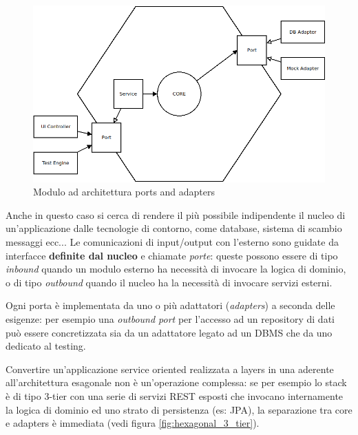 \begin{figure}[h]
	\centering
	\includegraphics[scale=0.5]{img/hexagonal}
	\caption{Modulo ad architettura ports and adapters}
	\label{fig:hexagonal}
\end{figure}

Anche in questo caso si cerca di rendere il più possibile indipendente il nucleo di un'applicazione dalle tecnologie di contorno, come database, sistema di scambio messaggi ecc...
Le comunicazioni di input/output con l'esterno sono guidate da interfacce \textbf{definite dal nucleo} e chiamate \textit{porte}: queste possono essere di tipo \textit{inbound} quando un modulo esterno ha necessità di invocare la logica di dominio, o di tipo \textit{outbound} quando il nucleo ha la necessità di invocare servizi esterni.

Ogni porta è implementata da uno o più adattatori (\textit{adapters}) a seconda delle esigenze: per esempio una \textit{outbound port} per l'accesso ad un repository di dati può essere concretizzata sia da un adattatore legato ad un DBMS che da uno dedicato al testing.

Convertire un'applicazione service oriented realizzata a layers in una aderente all'architettura esagonale non è un'operazione complessa: se per esempio lo stack è di tipo 3-tier con una serie di servizi REST esposti che invocano internamente la logica di dominio ed uno strato di persistenza (es: JPA), la separazione tra core e adapters è immediata (vedi figura \ref{fig:hexagonal_3_tier}).

